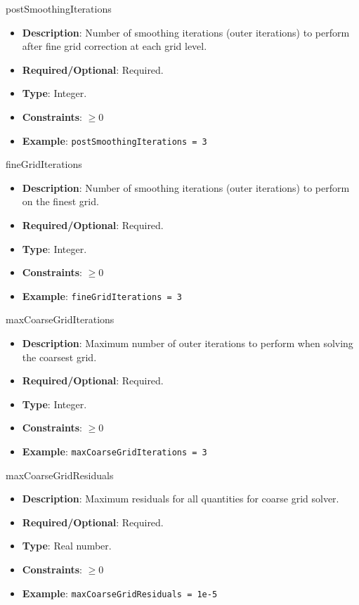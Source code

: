 postSmoothingIterations
\vspace{\the\parameterListSpacing}
\begin{itemize}
    \item {\bf Description}: Number of smoothing iterations (outer iterations) to perform after fine grid correction at each grid level. 
    \item {\bf Required/Optional}: Required.
    \item {\bf Type}: Integer.
    \item {\bf Constraints}: $\geq 0$
    \item {\bf Example}: \lstinline!postSmoothingIterations = 3!
\end{itemize}

fineGridIterations
\vspace{\the\parameterListSpacing}
\begin{itemize}
    \item {\bf Description}: Number of smoothing iterations (outer iterations) to perform on the finest grid. 
    \item {\bf Required/Optional}: Required.
    \item {\bf Type}: Integer.
    \item {\bf Constraints}: $\geq 0$
    \item {\bf Example}: \lstinline!fineGridIterations = 3!
\end{itemize}

maxCoarseGridIterations
\vspace{\the\parameterListSpacing}
\begin{itemize}
    \item {\bf Description}: Maximum number of outer iterations to perform when solving the coarsest grid. 
    \item {\bf Required/Optional}: Required.
    \item {\bf Type}: Integer.
    \item {\bf Constraints}: $\geq 0$
    \item {\bf Example}: \lstinline!maxCoarseGridIterations = 3!
\end{itemize}

maxCoarseGridResiduals
\vspace{\the\parameterListSpacing}
\begin{itemize}
    \item {\bf Description}: Maximum residuals for all quantities for coarse grid solver. 
    \item {\bf Required/Optional}: Required.
    \item {\bf Type}: Real number.
    \item {\bf Constraints}: $\geq 0$
    \item {\bf Example}: \lstinline!maxCoarseGridResiduals = 1e-5!
\end{itemize}